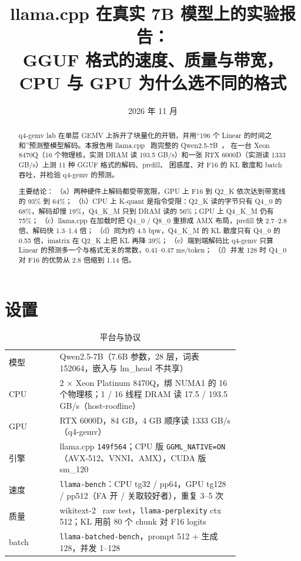 \documentclass[11pt,a4paper]{ctexart}
\title{llama.cpp 在真实 7B 模型上的实验报告：\\GGUF 格式的速度、质量与带宽，CPU 与 GPU 为什么选不同的格式}
\author{\authorline}
\date{2026 年 11 月}
\begin{document}
\maketitle

\begin{abstract}
q4-gemv lab 在单层 GEMV 上拆开了块量化的开销，并用“196 个 Linear 的时间之和”预测整模型解码。本报告用 llama.cpp~\cite{llamacpp} 跑完整的 Qwen2.5-7B~\cite{qwen25}，
在一台 Xeon 8470Q（16 个物理核，实测 DRAM 读 193.5 GB/s）和一张 RTX 6000D（实测读 1333 GB/s）上测 11 种 GGUF 格式的解码、prefill、
困惑度、对 F16 的 KL 散度和 batch 吞吐，并检验 q4-gemv 的预测。

主要结论：
（a）两种硬件上解码都受带宽限，GPU 上 F16 到 Q2\_K 依次达到带宽线的 93\% 到 64\%；
（b）CPU 上 K-quant 是指令受限：Q2\_K 读的字节只有 Q4\_0 的 68\%，解码却慢 19\%，Q4\_K\_M 只到 DRAM 读的 56\%；GPU 上 Q4\_K\_M 仍有 75\%；
（c）llama.cpp 在加载时把 Q4\_0 / Q8\_0 重排成 AMX 布局，prefill 快 2.7--2.8 倍、解码快 1.3--1.4 倍；
（d）同为约 4.5 bpw，Q4\_K\_M 的 KL 散度只有 Q4\_0 的 0.55 倍，imatrix 在 Q2\_K 上把 KL 再降 39\%；
（e）端到端解码比 q4-gemv 只算 Linear 的预测多一个与格式无关的常数，0.41--0.47 ms/token；
（f）并发 128 时 Q4\_0 对 F16 的优势从 2.8 倍缩到 1.14 倍。
\end{abstract}

\tableofcontents
\newpage

\section{设置}

\begin{table}[H]
\centering\small
\caption{平台与协议}\label{tab:setup}
\begin{tabular}{lp{0.78\linewidth}}
\toprule
模型 & Qwen2.5-7B（7.6B 参数，28 层，词表 152064，嵌入与 lm\_head 不共享） \\
CPU & 2 × Xeon Platinum 8470Q，绑 NUMA1 的 16 个物理核；1 / 16 线程 DRAM 读 17.5 / 193.5 GB/s（host-roofline） \\
GPU & RTX 6000D，84 GB，4 GB 顺序读 1333 GB/s（q4-gemv） \\
引擎 & llama.cpp \texttt{149f564}；CPU 版 \texttt{GGML\_NATIVE=ON}（AVX-512、VNNI、AMX），CUDA 版 sm\_120 \\
速度 & \texttt{llama-bench}：CPU tg32 / pp64，GPU tg128 / pp512（FA 开 / 关取较好者），重复 3--5 次 \\
质量 & wikitext-2~\cite{wikitext} raw test，\texttt{llama-perplexity} ctx 512；KL 用前 80 个 chunk 对 F16 logits \\
batch & \texttt{llama-batched-bench}，prompt 512 + 生成 128，并发 1--128 \\
\bottomrule
\end{tabular}
\end{table}
\end{document}
